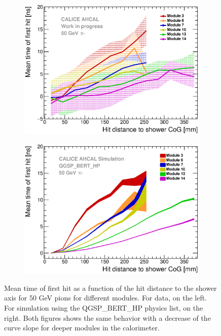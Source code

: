 \documentclass{JINST}
\begin{document}
\begin{figure}[htbp!]
  \begin{subfigure}[t]{0.49\textwidth}
    \centering
    \includegraphics[width=1\textwidth]{fig/Timing_Radius_Comparison_ShortAsymRange_IndividualLayers.eps}
    \caption{} \label{fig:Radius_Individual_Data_50GeV}
  \end{subfigure}
  \hfill
  \begin{subfigure}[t]{0.49\textwidth}
    \centering
    \includegraphics[width=1\textwidth]{fig/Timing_Radius_Comparison_ShortAsymRange_IndividualLayers_Sim.eps}
    \caption{} \label{fig:Radius_Individual_Sim_50GeV}
  \end{subfigure}
  \caption{Mean time of first hit as a function of the hit distance to the shower axis for 50 GeV pions for different modules. For data, on the left. For simulation using the QGSP\_BERT\_HP physics list, on the right. Both figures shows the same behavior with a decrease of the curve slope for deeper modules in the calorimeter.}
  \label{fig:Radius_SimData_50GeVComparison_Individual}
\end{figure}
\end{document}
